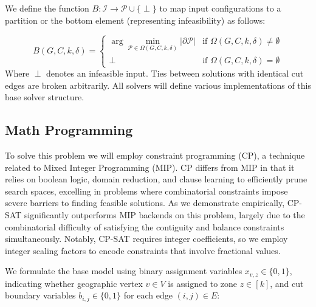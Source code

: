 \documentclass{article}
\begin{document}
We define the function $B: \mathcal{I} \to \mathcal{P} \cup \{\perp\}$ to map input configurations to a partition or the bottom element (representing infeasibility) as follows:

\begin{equation}
B(G, C, k, \delta) = 
\begin{cases} 
\arg\min_{\mathcal{P} \in \Omega(G, C, k, \delta)} |\partial \mathcal{P}| & \text{if } \Omega(G, C, k, \delta) \neq \emptyset \\
\perp & \text{if } \Omega(G, C, k, \delta) = \emptyset 
\end{cases}
\end{equation}
Where $\perp$ denotes an infeasible input. Ties between solutions with identical cut edges are broken arbitrarily. All solvers will define various implementations of this base solver structure. 

\subsection{Math Programming}

To solve this problem we will employ constraint programming (CP), a technique related to Mixed Integer Programming (MIP). CP differs from MIP in that it relies on boolean logic, domain reduction, and clause learning to efficiently prune search spaces, excelling in problems where combinatorial constraints impose severe barriers to finding feasible solutions. As we demonstrate empirically, CP-SAT significantly outperforms MIP backends on this problem, largely due to the combinatorial difficulty of satisfying the contiguity and balance constraints simultaneously. Notably, CP-SAT requires integer coefficients, so we employ integer scaling factors to encode constraints that involve fractional values.

We formulate the base model using binary assignment variables $x_{v,z} \in \{0, 1\}$, indicating whether geographic vertex $v \in V$ is assigned to zone $z \in [k]$, and cut boundary variables $b_{i,j} \in \{0, 1\}$ for each edge $(i,j) \in E$:
\end{document}

